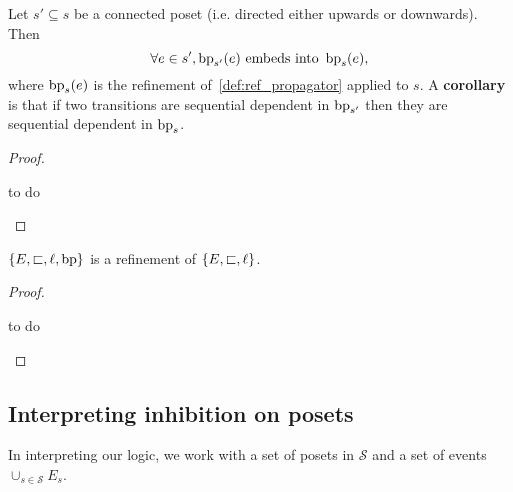 \begin{lemma}
  \label{lem:subposet}
  Let $s'\subseteq s$ be a connected poset (i.e. directed either upwards or downwards). Then
  \[\forall e\in s', \operatorname{bp}_{s'}(e)\text{ embeds into }\operatorname{bp}_s(e),\]
  where $\operatorname{bp}_s(e)$ is the refinement of~\autoref{def:ref_propagator} applied to $s$.
  A \textbf{corollary} is that if two transitions are sequential dependent in $\operatorname{bp}_{s'}$ then they are sequential dependent in $\operatorname{bp}_{s}$.
\end{lemma}
\begin{proof}
  \begin{mdframed}[backgroundcolor=blue!20]
    to do
  \end{mdframed}
\end{proof}

\begin{lemma}
  $\{E,\sqsubset,\ell,\operatorname{bp}\}$ is a refinement of $\{E,\sqsubset,\ell\}$.
\end{lemma}
\begin{proof}
  \begin{mdframed}[backgroundcolor=blue!20]
    to do
  \end{mdframed}
\end{proof}



\subsection{Interpreting inhibition on posets}

In interpreting our logic, we work with a set of posets in $\mathcal{S}$ and a set of events $\cup_{s\in\mathcal{S}} E_s$.

